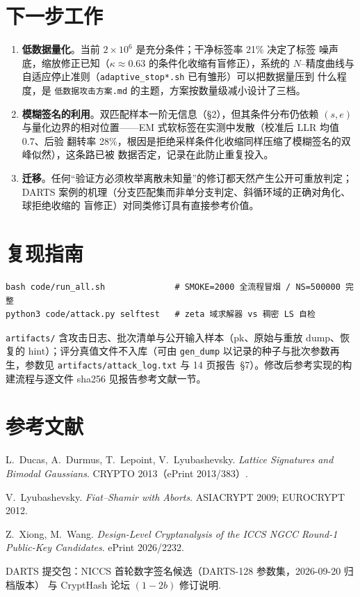 \documentclass[UTF8,11pt,a4paper]{ctexart}
\newcommand{\code}[1]{\texttt{\small #1}}
\begin{document}
\section{下一步工作}

\begin{enumerate}
\item \textbf{低数据量化}。当前 $2\times10^6$ 是充分条件；干净标签率 21\% 决定了标签
  噪声底，缩放修正已知（$\kappa \approx 0.63$ 的条件化收缩有盲修正），系统的
  $N$--精度曲线与自适应停止准则（\code{adaptive\_stop*.sh} 已有雏形）可以把数据量压到
  什么程度，是 \code{低数据攻击方案.md} 的主题，方案按数量级减小设计了三档。
\item \textbf{模糊签名的利用}。双匹配样本一阶无信息（\S2），但其条件分布仍依赖
  $(s,e)$ 与量化边界的相对位置——EM 式软标签在实测中发散（校准后 LLR 均值 0.7、后验
  翻转率 28\%，根因是拒绝采样条件化收缩同样压缩了模糊签名的双峰似然），这条路已被
  数据否定，记录在此防止重复投入。
\item \textbf{迁移}。任何``验证方必须枚举离散未知量''的修订都天然产生公开可重放判定；
  DARTS 案例的机理（分支匹配集而非单分支判定、斜循环域的正确对角化、球拒绝收缩的
  盲修正）对同类修订具有直接参考价值。
\end{enumerate}

\section{复现指南}

\begin{verbatim}
bash code/run_all.sh              # SMOKE=2000 全流程冒烟 / NS=500000 完整
python3 code/attack.py selftest   # zeta 域求解器 vs 稠密 LS 自检
\end{verbatim}

\code{artifacts/} 含攻击日志、批次清单与公开输入样本（pk、原始与重放 dump、恢复的
hint）；评分真值文件不入库（可由 \code{gen\_dump} 以记录的种子与批次参数再生，参数见
\code{artifacts/attack\_log.txt} 与 14 页报告~\S7）。修改后参考实现的构建流程与逐文件
sha256 见报告参考文献一节。

\section*{参考文献}
\begin{enumerate}[label={[\arabic*]}]
\item L.~Ducas, A.~Durmus, T.~Lepoint, V.~Lyubashevsky. \emph{Lattice Signatures and
  Bimodal Gaussians}. CRYPTO 2013（ePrint 2013/383）.
\item V.~Lyubashevsky. \emph{Fiat--Shamir with Aborts}. ASIACRYPT 2009; EUROCRYPT 2012.
\item Z.~Xiong, M.~Wang. \emph{Design-Level Cryptanalysis of the ICCS NGCC Round-1
  Public-Key Candidates}. ePrint 2026/2232.
\item DARTS 提交包：NICCS 首轮数字签名候选（DARTS-128 参数集，2026-09-20 归档版本）
  与 CryptHash 论坛 $(1-2b)$ 修订说明.
\end{enumerate}
\end{document}
